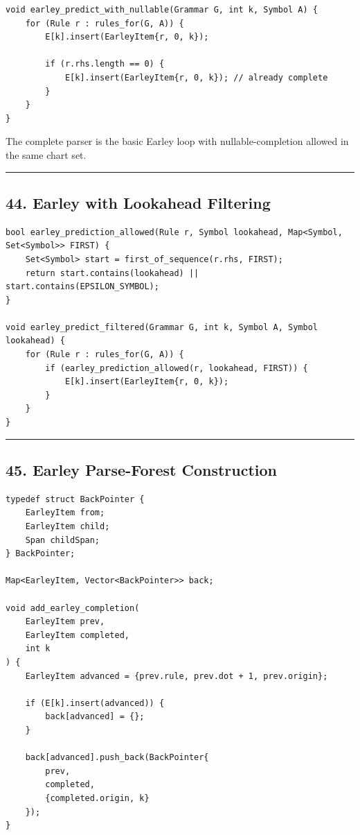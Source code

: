 \documentclass[10pt,letterpaper]{article}
\begin{document}
\begin{verbatim}
void earley_predict_with_nullable(Grammar G, int k, Symbol A) {
    for (Rule r : rules_for(G, A)) {
        E[k].insert(EarleyItem{r, 0, k});

        if (r.rhs.length == 0) {
            E[k].insert(EarleyItem{r, 0, k}); // already complete
        }
    }
}
\end{verbatim}

The complete parser is the basic Earley loop with nullable-completion allowed in the same chart set.

\medskip\hrule\medskip

\subsection*{44. Earley with Lookahead Filtering}

\begin{verbatim}
bool earley_prediction_allowed(Rule r, Symbol lookahead, Map<Symbol, Set<Symbol>> FIRST) {
    Set<Symbol> start = first_of_sequence(r.rhs, FIRST);
    return start.contains(lookahead) || start.contains(EPSILON_SYMBOL);
}

void earley_predict_filtered(Grammar G, int k, Symbol A, Symbol lookahead) {
    for (Rule r : rules_for(G, A)) {
        if (earley_prediction_allowed(r, lookahead, FIRST)) {
            E[k].insert(EarleyItem{r, 0, k});
        }
    }
}
\end{verbatim}

\medskip\hrule\medskip

\subsection*{45. Earley Parse-Forest Construction}

\begin{verbatim}
typedef struct BackPointer {
    EarleyItem from;
    EarleyItem child;
    Span childSpan;
} BackPointer;

Map<EarleyItem, Vector<BackPointer>> back;

void add_earley_completion(
    EarleyItem prev,
    EarleyItem completed,
    int k
) {
    EarleyItem advanced = {prev.rule, prev.dot + 1, prev.origin};

    if (E[k].insert(advanced)) {
        back[advanced] = {};
    }

    back[advanced].push_back(BackPointer{
        prev,
        completed,
        {completed.origin, k}
    });
}
\end{verbatim}
\end{document}
